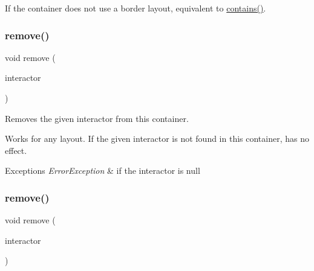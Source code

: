 If the container does not use a border layout, equivalent to \mbox{\hyperlink{classsgl_1_1GContainer_a29e67f98cd36414c67475b8941d861a6}{contains()}}. \mbox{\label{classsgl_1_1GContainer_a1c12b1fde5c2ef10d79d4ee51e670efa}} 
\subsubsection{\texorpdfstring{remove()}{remove()}\hspace{0.1cm}{\footnotesize\ttfamily [1/3]}}
{\footnotesize\ttfamily void remove (\begin{DoxyParamCaption}\item[{\mbox{\hyperlink{classsgl_1_1GInteractor}{G\+Interactor}} $\ast$}]{interactor }\end{DoxyParamCaption})\hspace{0.3cm}{\ttfamily [virtual]}}



Removes the given interactor from this container. 

Works for any layout. If the given interactor is not found in this container, has no effect. 
\begin{DoxyExceptions}{Exceptions}
{\em Error\+Exception} & if the interactor is null \\
\hline
\end{DoxyExceptions}
\mbox{\label{classsgl_1_1GContainer_ade2376c458ac401a0bd2dbe44271509e}} 
\subsubsection{\texorpdfstring{remove()}{remove()}\hspace{0.1cm}{\footnotesize\ttfamily [2/3]}}
{\footnotesize\ttfamily void remove (\begin{DoxyParamCaption}\item[{\mbox{\hyperlink{classsgl_1_1GInteractor}{G\+Interactor}} \&}]{interactor }\end{DoxyParamCaption})\hspace{0.3cm}{\ttfamily [virtual]}}



